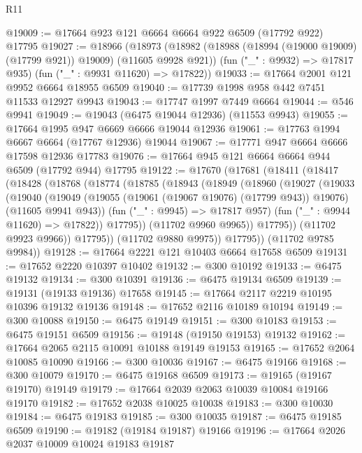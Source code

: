 \begin{lexlean}{R11}
\begin{coremodule}
{{{{{{{{{{{{{{{{{{{{{{{{{{{{{{{{{{{{{{{{{{{{{{{{{{{{{{{{{{{{{{{{{{{{{{{{{{{{{{{{{{@19009 := @17664 @923 @121 @6664 @6664 @922 @6509 (@17792 @922) @17795
@19027 := @18966
    (@18973
      (@18982 (@18988 (@18994 (@19000 @19009) (@17799 @921)) @19009) (@11605 @9928 @921))
      (fun ("_" : @9932) => @17817 @935)
      (fun ("_" : @9931 @11620) => @17822))
@19033 := @17664 @2001 @121 @9952 @6664 @18955 @6509
@19040 := @17739 @1998 @958 @442 @7451 @11533 @12927 @9943
@19043 := @17747 @1997 @7449 @6664
@19044 := @546 @9941
@19049 := @19043 (@6475 @19044 @12936) (@11553 @9943)
@19055 := @17664 @1995 @947 @6669 @6666 @19044 @12936
@19061 := @17763 @1994 @6667 @6664 (@17767 @12936) @19044
@19067 := @17771 @947 @6664 @6666 @17598 @12936 @17783
@19076 := @17664 @945 @121 @6664 @6664 @944 @6509 (@17792 @944) @17795
@19122 := @17670
    (@17681
      (@18411
        (@18417
          (@18428
            (@18768
              (@18774
                (@18785
                  (@18943
                    (@18949
                      (@18960
                        (@19027
                          (@19033
                            (@19040
                              (@19049
                                (@19055 (@19061 (@19067 @19076) (@17799 @943)) @19076)
                                (@11605 @9941 @943))
                              (fun ("_" : @9945) => @17817 @957)
                              (fun ("_" : @9944 @11620) => @17822))
                            @17795))
                        (@11702 @9960 @9965))
                      @17795))
                  (@11702 @9923 @9966))
                @17795))
            (@11702 @9880 @9975))
          @17795))
      (@11702 @9785 @9984))
@19128 := @17664 @2221 @121 @10403 @6664 @17658 @6509
@19131 := @17652 @2220 @10397 @10402
@19132 := @300 @10192
@19133 := @6475 @19132
@19134 := @300 @10391
@19136 := @6475 @19134 @6509
@19139 := @19131 (@19133 @19136) @17658
@19145 := @17664 @2117 @2219 @10195 @10396 @19132 @19136
@19148 := @17652 @2116 @10189 @10194
@19149 := @300 @10088
@19150 := @6475 @19149
@19151 := @300 @10183
@19153 := @6475 @19151 @6509
@19156 := @19148 (@19150 @19153) @19132
@19162 := @17664 @2065 @2115 @10091 @10188 @19149 @19153
@19165 := @17652 @2064 @10085 @10090
@19166 := @300 @10036
@19167 := @6475 @19166
@19168 := @300 @10079
@19170 := @6475 @19168 @6509
@19173 := @19165 (@19167 @19170) @19149
@19179 := @17664 @2039 @2063 @10039 @10084 @19166 @19170
@19182 := @17652 @2038 @10025 @10038
@19183 := @300 @10030
@19184 := @6475 @19183
@19185 := @300 @10035
@19187 := @6475 @19185 @6509
@19190 := @19182 (@19184 @19187) @19166
@19196 := @17664 @2026 @2037 @10009 @10024 @19183 @19187
}}}}}}}}}}}}}}}}}}}}}}}}}}}}}}}}}}}}}}}}}}}}}}}}}}}}}}}}}}}}}}}}}}}}}}}}}}}}}}}}}}
\end{coremodule}
\end{lexlean}
